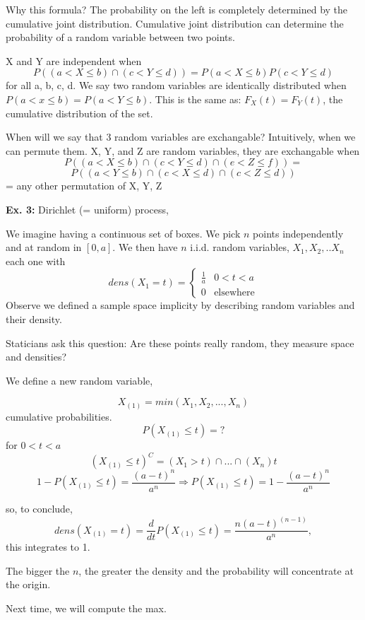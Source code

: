 Why this formula?
The probability on the left is completely determined by the cumulative
joint distribution. Cumulative joint distribution can determine the
probability of a random variable between two points.

X and Y are independent when \[P((a<X\leq b) \cap (c<Y\leq d)) =
P(a< X\leq b) P(c<Y\leq d)\] for all a, b, c, d.
We say two random variables are identically distributed when 
$P(a<x\leq b) = P(a<Y\leq b)$. This is the same as:
$F_{X}(t) = F_{Y}(t)$, the cumulative distribution of the
set.

When will we say that 3 random variables are exchangable? Intuitively, when we can
permute them.
X, Y, and Z are random variables, they are exchangable when
\[P((a<X\leq b) \cap (c<Y\leq d) \cap (e<Z\leq f)) = \] \[P((a<Y
\leq b) \cap (c<X\leq d) \cap (c<Z\leq d))\] = any
other permutation of X, Y, Z

{\bf Ex. 3:} Dirichlet (= uniform) process,

We imagine having a continuous set of boxes. We pick $n$ points independently and at random in $[0,a]$. We then have $n$ i.i.d. random variables,
$X_{1}, X_{2},..X_{n}$ each one with \[dens(X_{1}=t) = \left\{ \begin{array}{ll} \frac{1}{a} &\mbox{$0<t<a$} \\ 0 & \mbox{elsewhere} \end{array} \right. \]
Observe we defined a sample space implicity by describing random variables and their density.

Staticians ask this question:
Are these points really random, they measure space and densities?

We define a new random variable,

 \[X_{(1)} = min(X_{1}, X_{2},...,X_{n})\] cumulative
probabilities.
\[P(X_{(1)}\leq t) = ? \] for $0<t<a$
\[(X_{(1)}\leq t)^{C} = (X_{1}>t) \cap...\cap (X_{n})t\]
\[1-P(X_{(1)}\leq t) =\frac{{(a-t)}^{n}}{{a}^{n}} \Rightarrow P(X_{(1)}\leq t) = 1- \frac{{(a-t)}^{n}}{{a}^{n}}\]

so, to conclude, \[dens(X_{(1)}=t)=\frac{d}{dt}P(X_{(1)}\leq t)=\frac{{n}{(a-t)}^{(n-1)}}{{a}^{n}},\] this integrates to 1.

The bigger the $n$, the greater the density and the probability will
concentrate at the origin. 

Next time, we will compute the max.











